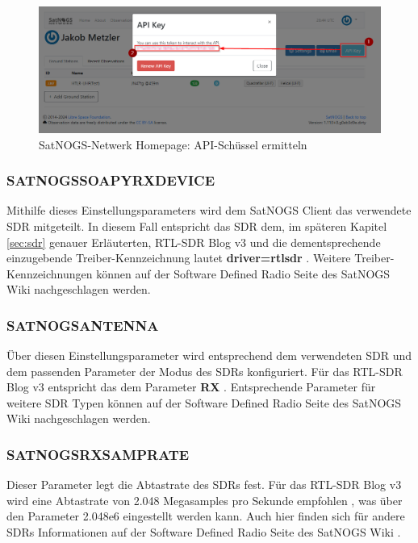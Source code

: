\begin{figure} [H]
	\centering
	\includegraphics[width=.75\linewidth]{../ref/apitoken.png}
	\caption{SatNOGS-Netwerk Homepage: API-Schüssel ermitteln}
	\label{fig:apikey}
\end{figure}

\subsubsection{SATNOGS\textunderscore SOAPY\textunderscore RX\textunderscore DEVICE}
Mithilfe dieses Einstellungsparameters wird dem SatNOGS Client das verwendete SDR mitgeteilt. In diesem Fall entspricht das SDR dem, im späteren Kapitel \ref{sec:sdr} genauer Erläuterten, RTL-SDR Blog v3 und die dementsprechende einzugebende Treiber-Kennzeichnung lautet \textbf{driver=rtlsdr} \cite{noauthor_satnogsclient_nodate}. Weitere Treiber-Kennzeichnungen können auf der Software Defined Radio Seite des SatNOGS Wiki \cite{noauthor_software_nodate} nachgeschlagen werden.

\subsubsection{SATNOGS\textunderscore ANTENNA}
Über diesen Einstellungsparameter wird entsprechend dem verwendeten SDR und dem passenden Parameter der Modus des SDRs konfiguriert. Für das RTL-SDR Blog v3 entspricht das dem Parameter \textbf{RX} \cite{noauthor_satnogsclient_nodate}. Entsprechende Parameter für weitere SDR Typen können auf der Software Defined Radio Seite des SatNOGS Wiki \cite{noauthor_software_nodate} nachgeschlagen werden. 

\subsubsection{SATNOGS\textunderscore RX\textunderscore SAMP\textunderscore RATE}
Dieser Parameter legt die Abtastrate des SDRs fest. Für das RTL-SDR Blog v3 wird eine Abtastrate von 2.048 Megasamples pro Sekunde empfohlen \cite{noauthor_satnogsclient_nodate}, was über den Parameter 2.048e6 eingestellt werden kann. Auch hier finden sich für andere SDRs Informationen auf der Software Defined Radio Seite des SatNOGS Wiki \cite{noauthor_software_nodate}. 

